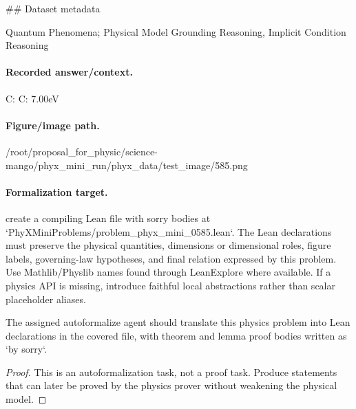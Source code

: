\#\# Dataset metadata

Quantum Phenomena; Physical Model Grounding Reasoning, Implicit Condition Reasoning

\paragraph{Recorded answer/context.}
C: C: 7.00eV

\paragraph{Figure/image path.}
/root/proposal\_for\_physic/science-mango/phyx\_mini\_run/phyx\_data/test\_image/585.png

\paragraph{Formalization target.}
create a compiling Lean file with sorry bodies at `PhyXMiniProblems/problem\_phyx\_mini\_0585.lean`. The Lean declarations must preserve the physical quantities, dimensions or dimensional roles, figure labels, governing-law hypotheses, and final relation expressed by this problem.
Use Mathlib/Physlib names found through LeanExplore where available. If a physics API is missing, introduce faithful local abstractions rather than scalar placeholder aliases.

\begin{theorem}
\label{thm:physics:phyx_mini_0585:target}
The assigned autoformalize agent should translate this physics problem into Lean declarations in the covered file, with theorem and lemma proof bodies written as `by sorry`.
\end{theorem}
\begin{proof}
This is an autoformalization task, not a proof task. Produce statements that can later be proved by the physics prover without weakening the physical model.
\end{proof}

